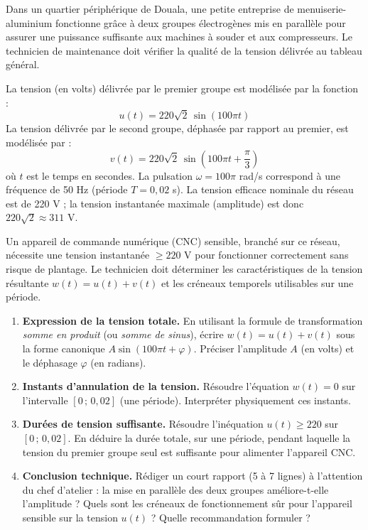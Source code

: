 \documentclass[11pt]{article}
\begin{document}
\begin{exemplebox}
Dans un quartier périphérique de Douala, une petite entreprise de menuiserie-aluminium fonctionne grâce à deux groupes électrogènes mis en parallèle pour assurer une puissance suffisante aux machines à souder et aux compresseurs. Le technicien de maintenance doit vérifier la qualité de la tension délivrée au tableau général.

La tension (en volts) délivrée par le premier groupe est modélisée par la fonction :
\[ u(t) = 220\sqrt{2}\,\sin(100\pi t) \]
La tension délivrée par le second groupe, déphasée par rapport au premier, est modélisée par :
\[ v(t) = 220\sqrt{2}\,\sin\!\left(100\pi t + \frac{\pi}{3}\right) \]
où $t$ est le temps en secondes. La pulsation $\omega = 100\pi$ rad/s correspond à une fréquence de 50 Hz (période $T = 0,02$ s). La tension efficace nominale du réseau est de 220 V ; la tension instantanée maximale (amplitude) est donc $220\sqrt{2} \approx 311$ V.

Un appareil de commande numérique (CNC) sensible, branché sur ce réseau, nécessite une tension instantanée $\geq 220$ V pour fonctionner correctement sans risque de plantage. Le technicien doit déterminer les caractéristiques de la tension résultante $w(t) = u(t) + v(t)$ et les créneaux temporels utilisables sur une période.
\end{exemplebox}

\begin{methode}[Consignes]
\begin{enumerate}
    \item \textbf{Expression de la tension totale.} En utilisant la formule de transformation \emph{somme en produit} (ou \emph{somme de sinus}), écrire $w(t) = u(t) + v(t)$ sous la forme canonique $A\sin(100\pi t + \varphi)$. Préciser l'amplitude $A$ (en volts) et le déphasage $\varphi$ (en radians).
    \item \textbf{Instants d'annulation de la tension.} Résoudre l'équation $w(t) = 0$ sur l'intervalle $[0\,;\, 0,02]$ (une période). Interpréter physiquement ces instants.
    \item \textbf{Durées de tension suffisante.} Résoudre l'inéquation $u(t) \geq 220$ sur $[0\,;\, 0,02]$. En déduire la durée totale, sur une période, pendant laquelle la tension du premier groupe seul est suffisante pour alimenter l'appareil CNC.
    \item \textbf{Conclusion technique.} Rédiger un court rapport (5 à 7 lignes) à l'attention du chef d'atelier : la mise en parallèle des deux groupes améliore-t-elle l'amplitude ? Quels sont les créneaux de fonctionnement sûr pour l'appareil sensible sur la tension $u(t)$ ? Quelle recommandation formuler ?
\end{enumerate}
\end{methode}
\end{document}

